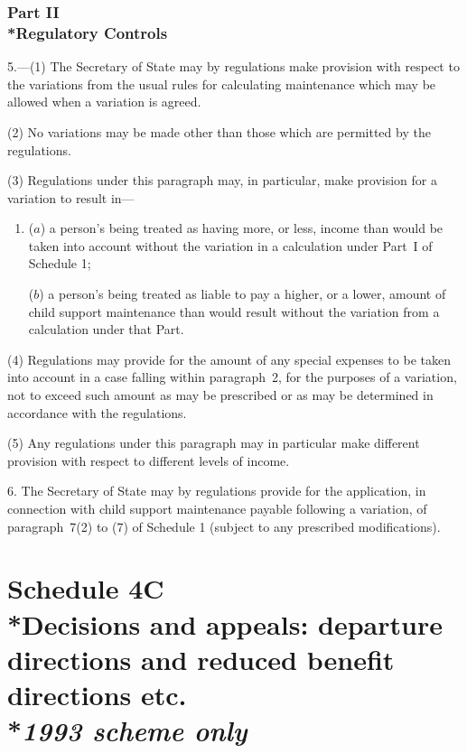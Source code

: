 \documentclass[12pt,a4paper]{article}
\begin{document}
\section[Part II --- Regulatory Controls]{Part II\\*Regulatory Controls}

5.---(1) The Secretary of State may by regulations make provision with respect to the variations from the usual rules for calculating maintenance which may be allowed when a variation is agreed.

(2) No variations may be made other than those which are permitted by the regulations.

(3) Regulations under this paragraph may, in particular, make provision for a variation to result in—
\begin{enumerate}\item[]
($a$) a person’s being treated as having more, or less, income than would be taken into account without the variation in a calculation under Part~I of Schedule 1;

($b$) a person’s being treated as liable to pay a higher, or a lower, amount of child support maintenance than would result without the variation from a calculation under that Part.
\end{enumerate}

(4) Regulations may provide for the amount of any special expenses to be taken into account in a case falling within paragraph~2, for the purposes of a variation, not to exceed such amount as may be prescribed or as may be determined in accordance with the regulations.

(5) Any regulations under this paragraph may in particular make different provision with respect to different levels of income.

\medskip

6. The Secretary of State may by regulations provide for the application, in connection with child support maintenance payable following a variation, of paragraph~7(2)  to (7)  of Schedule 1 (subject to any prescribed modifications).

\part[Schedule 4C --- Decisions and appeals: departure directions and reduced benefit directions etc. --- \emph{1993 scheme only}]{Schedule 4C\\*Decisions and appeals: departure directions and reduced benefit directions etc.\\*\emph{1993 scheme only}}
\end{document}
